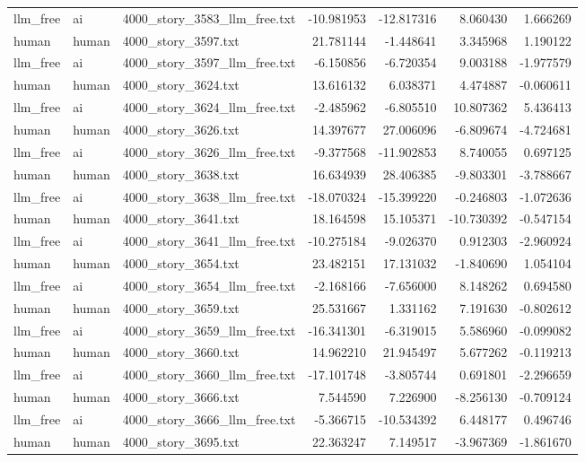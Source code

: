 \begin{longtable}{lllrrrr}
llm\_free & ai & 4000\_story\_3583\_llm\_free.txt & -10.981953 & -12.817316 & 8.060430 & 1.666269 \\
human & human & 4000\_story\_3597.txt & 21.781144 & -1.448641 & 3.345968 & 1.190122 \\
llm\_free & ai & 4000\_story\_3597\_llm\_free.txt & -6.150856 & -6.720354 & 9.003188 & -1.977579 \\
human & human & 4000\_story\_3624.txt & 13.616132 & 6.038371 & 4.474887 & -0.060611 \\
llm\_free & ai & 4000\_story\_3624\_llm\_free.txt & -2.485962 & -6.805510 & 10.807362 & 5.436413 \\
human & human & 4000\_story\_3626.txt & 14.397677 & 27.006096 & -6.809674 & -4.724681 \\
llm\_free & ai & 4000\_story\_3626\_llm\_free.txt & -9.377568 & -11.902853 & 8.740055 & 0.697125 \\
human & human & 4000\_story\_3638.txt & 16.634939 & 28.406385 & -9.803301 & -3.788667 \\
llm\_free & ai & 4000\_story\_3638\_llm\_free.txt & -18.070324 & -15.399220 & -0.246803 & -1.072636 \\
human & human & 4000\_story\_3641.txt & 18.164598 & 15.105371 & -10.730392 & -0.547154 \\
llm\_free & ai & 4000\_story\_3641\_llm\_free.txt & -10.275184 & -9.026370 & 0.912303 & -2.960924 \\
human & human & 4000\_story\_3654.txt & 23.482151 & 17.131032 & -1.840690 & 1.054104 \\
llm\_free & ai & 4000\_story\_3654\_llm\_free.txt & -2.168166 & -7.656000 & 8.148262 & 0.694580 \\
human & human & 4000\_story\_3659.txt & 25.531667 & 1.331162 & 7.191630 & -0.802612 \\
llm\_free & ai & 4000\_story\_3659\_llm\_free.txt & -16.341301 & -6.319015 & 5.586960 & -0.099082 \\
human & human & 4000\_story\_3660.txt & 14.962210 & 21.945497 & 5.677262 & -0.119213 \\
llm\_free & ai & 4000\_story\_3660\_llm\_free.txt & -17.101748 & -3.805744 & 0.691801 & -2.296659 \\
human & human & 4000\_story\_3666.txt & 7.544590 & 7.226900 & -8.256130 & -0.709124 \\
llm\_free & ai & 4000\_story\_3666\_llm\_free.txt & -5.366715 & -10.534392 & 6.448177 & 0.496746 \\
human & human & 4000\_story\_3695.txt & 22.363247 & 7.149517 & -3.967369 & -1.861670 \\

\end{longtable}
